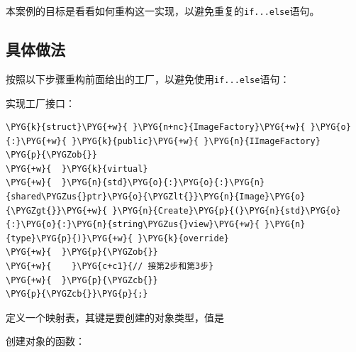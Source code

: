 本案例的目标是看看如何重构这一实现，以避免重复的\texttt{if...\allowbreak{}else}语句。



\subsection{具体做法}



按照以下步骤重构前面给出的工厂，以避免使用\texttt{if...\allowbreak{}else}语句：



实现工厂接口：



\begin{codeblockbg}
\begin{Verbatim}[commandchars=\\\{\},breaklines=true,breakanywhere=true,fontsize=\codefont,xleftmargin=17bp]
\PYG{k}{struct}\PYG{+w}{ }\PYG{n+nc}{ImageFactory}\PYG{+w}{ }\PYG{o}{:}\PYG{+w}{ }\PYG{k}{public}\PYG{+w}{ }\PYG{n}{IImageFactory}
\PYG{p}{\PYGZob{}}
\PYG{+w}{  }\PYG{k}{virtual}
\PYG{+w}{  }\PYG{n}{std}\PYG{o}{:}\PYG{o}{:}\PYG{n}{shared\PYGZus{}ptr}\PYG{o}{\PYGZlt{}}\PYG{n}{Image}\PYG{o}{\PYGZgt{}}\PYG{+w}{ }\PYG{n}{Create}\PYG{p}{(}\PYG{n}{std}\PYG{o}{:}\PYG{o}{:}\PYG{n}{string\PYGZus{}view}\PYG{+w}{ }\PYG{n}{type}\PYG{p}{)}\PYG{+w}{ }\PYG{k}{override}
\PYG{+w}{  }\PYG{p}{\PYGZob{}}
\PYG{+w}{    }\PYG{c+c1}{// 接第2步和第3步}
\PYG{+w}{  }\PYG{p}{\PYGZcb{}}
\PYG{p}{\PYGZcb{}}\PYG{p}{;}
\end{Verbatim}
\end{codeblockbg}



定义一个映射表，其键是要创建的对象类型，值是



创建对象的函数：



